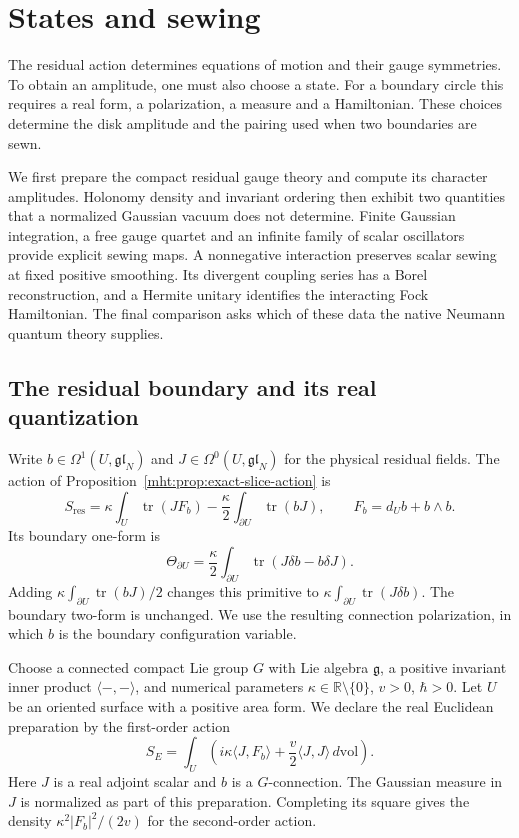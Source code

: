 \chapter{States and sewing}
\label{mht:ch:states-sewing}

The residual action determines equations of motion and their gauge
symmetries. To obtain an amplitude, one must also choose a state.
For a boundary circle this requires a real form, a polarization,
a measure and a Hamiltonian. These choices determine the disk
amplitude and the pairing used when two boundaries are sewn.

We first prepare the compact residual gauge theory and compute its
character amplitudes. Holonomy density and invariant ordering then
exhibit two quantities that a normalized Gaussian vacuum does not
determine. Finite Gaussian integration, a free gauge quartet and an
infinite family of scalar oscillators provide explicit sewing maps.
A nonnegative interaction preserves scalar sewing at fixed positive
smoothing. Its divergent coupling series has a Borel reconstruction,
and a Hermite unitary identifies the interacting Fock Hamiltonian.
The final comparison asks which of these data the native Neumann
quantum theory supplies.

\section{The residual boundary and its real quantization}

Write $b\in\Omega^1(U,\mathfrak{gl}_N)$ and
$J\in\Omega^0(U,\mathfrak{gl}_N)$ for the physical residual fields.
The action of Proposition~\ref{mht:prop:exact-slice-action} is
\[
 S_{\mathrm{res}}=\kappa\int_U\operatorname{tr}(JF_b)
       -\frac\kappa2\int_{\partial U}\operatorname{tr}(bJ),
 \qquad F_b=d_Ub+b\wedge b.
\]
Its boundary one-form is
\[
 \Theta_{\partial U}=\frac\kappa2\int_{\partial U}
                    \operatorname{tr}(J\delta b-b\delta J).
\]
Adding $\kappa\int_{\partial U}\operatorname{tr}(bJ)/2$ changes
this primitive to $\kappa\int_{\partial U}\operatorname{tr}(J\delta b)$.
The boundary two-form is unchanged. We use the resulting connection
polarization, in which $b$ is the boundary configuration variable.

Choose a connected compact Lie group $G$ with Lie algebra
$\mathfrak g$, a positive invariant inner product
$\langle-,-\rangle$, and numerical parameters
$\kappa\in\mathbb R\setminus\{0\}$, $v>0$, $\hbar>0$.
Let $U$ be an oriented surface with a positive area form.
We declare the real Euclidean preparation by the first-order action
\begin{equation}\label{mht:eq:prepared-residual-action}
 S_E=\int_U\left(i\kappa\langle J,F_b\rangle
              +\frac v2\langle J,J\rangle\,d\mathrm{vol}\right).
\end{equation}
Here $J$ is a real adjoint scalar and $b$ is a $G$-connection.
The Gaussian measure in $J$ is normalized as part of this preparation.
Completing its square gives the density
$\kappa^2|F_b|^2/(2v)$ for the second-order action.

